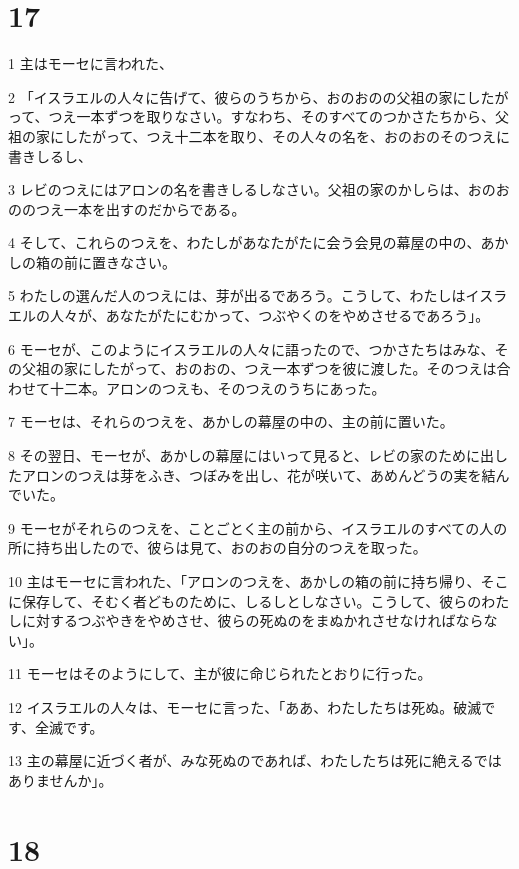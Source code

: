 \chapter{17}

\par 1 主はモーセに言われた、
\par 2 「イスラエルの人々に告げて、彼らのうちから、おのおのの父祖の家にしたがって、つえ一本ずつを取りなさい。すなわち、そのすべてのつかさたちから、父祖の家にしたがって、つえ十二本を取り、その人々の名を、おのおのそのつえに書きしるし、
\par 3 レビのつえにはアロンの名を書きしるしなさい。父祖の家のかしらは、おのおののつえ一本を出すのだからである。
\par 4 そして、これらのつえを、わたしがあなたがたに会う会見の幕屋の中の、あかしの箱の前に置きなさい。
\par 5 わたしの選んだ人のつえには、芽が出るであろう。こうして、わたしはイスラエルの人々が、あなたがたにむかって、つぶやくのをやめさせるであろう」。
\par 6 モーセが、このようにイスラエルの人々に語ったので、つかさたちはみな、その父祖の家にしたがって、おのおの、つえ一本ずつを彼に渡した。そのつえは合わせて十二本。アロンのつえも、そのつえのうちにあった。
\par 7 モーセは、それらのつえを、あかしの幕屋の中の、主の前に置いた。
\par 8 その翌日、モーセが、あかしの幕屋にはいって見ると、レビの家のために出したアロンのつえは芽をふき、つぼみを出し、花が咲いて、あめんどうの実を結んでいた。
\par 9 モーセがそれらのつえを、ことごとく主の前から、イスラエルのすべての人の所に持ち出したので、彼らは見て、おのおの自分のつえを取った。
\par 10 主はモーセに言われた、「アロンのつえを、あかしの箱の前に持ち帰り、そこに保存して、そむく者どものために、しるしとしなさい。こうして、彼らのわたしに対するつぶやきをやめさせ、彼らの死ぬのをまぬかれさせなければならない」。
\par 11 モーセはそのようにして、主が彼に命じられたとおりに行った。
\par 12 イスラエルの人々は、モーセに言った、「ああ、わたしたちは死ぬ。破滅です、全滅です。
\par 13 主の幕屋に近づく者が、みな死ぬのであれば、わたしたちは死に絶えるではありませんか」。

\chapter{18}

